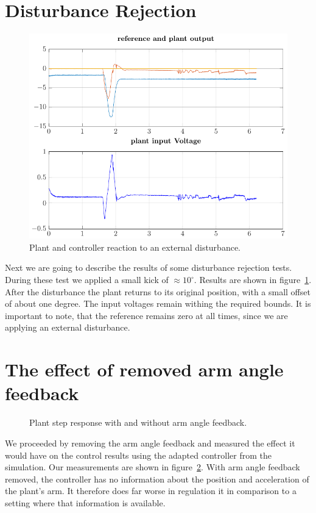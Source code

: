\documentclass[ twoside,openright,titlepage,numbers=noenddot,headinclude,%
                footinclude=true,cleardoublepage=empty,abstractoff, %
                BCOR=5mm,paper=a4,fontsize=11pt,%
                ngerman,american,%
                ]{scrreprt}
\begin{document}
{\section{Disturbance Rejection}
\begin{figure}
\includegraphics[scale = 0.65]{images/disturbance.pdf}
\caption{Plant and controller reaction to an external disturbance.}
\label{fig:disturbance}
\end{figure}
Next we are going to describe the results of some disturbance rejection tests. During these test we applied a small kick of $\approx 10^\circ$. Results are shown in figure~\ref{fig:disturbance}. After the disturbance the plant returns to its original position, with a small offset of about one degree. The input voltages remain withing the required bounds. It is important to note, that the reference remains zero at all times, since we are applying an external disturbance.

\section{The effect of removed arm angle feedback}
\begin{figure}

\caption{Plant step response with and without arm angle feedback.}
\label{fig:alphaNoAlpha}
\end{figure}
We proceeded by removing the arm angle feedback and measured the effect it would have on the control results using the adapted controller from the simulation. Our measurements are shown in figure~\ref{fig:alphaNoAlpha}. With arm angle feedback removed, the controller has no information about the position and acceleration of the plant's arm. It therefore does far worse in regulation it in comparison to a setting where that information is available. 

}
\end{document}
